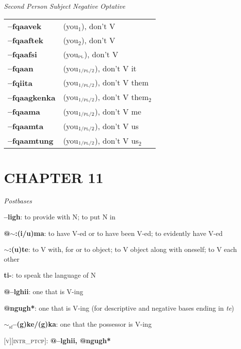 \documentclass{article}
\begin{document}
\bigskip

\textit{Second Person Subject Negative Optative}

\begin{tabular}{ l l }
\textbf{--fqaavek} & (you$_1$), don't V \\
\textbf{--fqaaftek} & (you$_2$), don't V \\
\textbf{--fqaafsi} & (you$_\text{\textsc{pl}}$), don't V \\
\textbf{--fqaan} & (you$_\text{\textsc{1/pl/2}}$), don't V it \\
\textbf{--fqiita} & (you$_\text{\textsc{1/pl/2}}$), don't V them \\
\textbf{--fqaagkenka} & (you$_\text{\textsc{1/pl/2}}$), don't V them$_2$ \\
\textbf{--fqaama} & (you$_\text{\textsc{1/pl/2}}$), don't V me \\
\textbf{--fqaamta} & (you$_\text{\textsc{1/pl/2}}$), don't V us \\
\textbf{--fqaamtung} & (you$_\text{\textsc{1/pl/2}}$), don't V us$_2$
\end{tabular}


\section{CHAPTER 11}

\textit{Postbases}
\begin{description}
\item \textbf{--ligh}: to provide with N; to put N in
\item \textbf{@$\sim$:(i/u)ma}: to have V-ed or to have been V-ed; to evidently have V-ed
\item \textbf{$\sim$:(u)te}: to V with, for or to object; to V object along with oneself; to V each other
\item \textbf{ti-}: to speak the language of N
\item \textbf{@--lghii}: one that is V-ing
\item \textbf{@ngugh*}: one that is V-ing (for descriptive and negative bases ending in \textit{te})
\item \textbf{$\sim_\text{sf}$--(g)ke/(g)ka}: one that the possessor is V-ing
\end{description}

\bigskip

\textsc{[v][intr\_ptcp]}: \textbf{@--lghii, @ngugh*}
\end{document}
